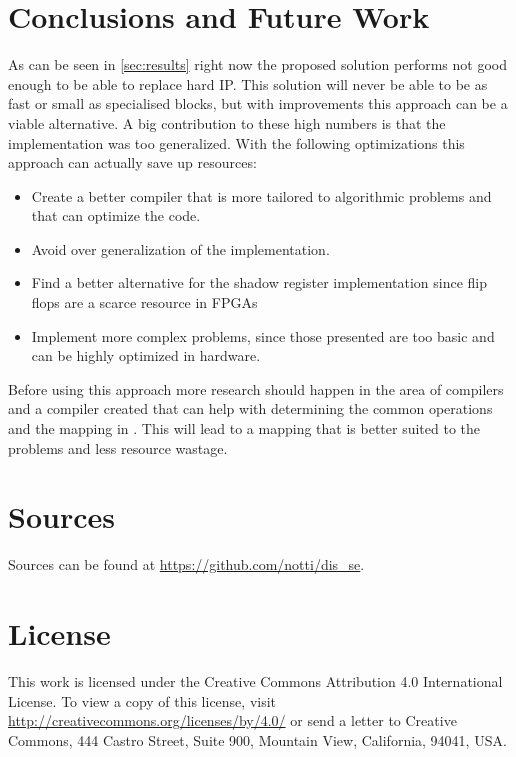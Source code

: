 \documentclass[11pt,twocolumn,technote,a4paper]{IEEEtran}
\begin{document}
\section{Conclusions and Future Work}
As can be seen in \cref{sec:results} right now the proposed solution
performs not good enough to be able to replace hard IP. This solution
will never be able to be as fast or small as specialised blocks, but
with improvements this approach can be a viable alternative. A big contribution
to these high numbers is that the implementation was too generalized. With
the following optimizations this approach can actually save up resources:
\begin{itemize}
    \item Create a better compiler that is more tailored to algorithmic
        problems and that can optimize the code.
    \item Avoid over generalization of the implementation.
    \item Find a better alternative for the shadow register implementation
        since flip flops are a scarce resource in FPGAs
    \item Implement more complex problems, since those presented are too basic
        and can be highly optimized in hardware.
\end{itemize}
Before using this approach more research should happen in the area of compilers
and a compiler created that can help with determining the common operations
and the mapping in . This will lead to a mapping that is
better suited to the problems and less resource wastage.


\begingroup
\raggedright
\sloppy

\endgroup

\section*{Sources}
Sources can be found at \url{https://github.com/notti/dis_se}.
\section*{License}

This work is licensed under the Creative Commons Attribution 4.0 International
License. To view a copy of this license, visit
\url{http://creativecommons.org/licenses/by/4.0/} or send a letter to Creative
Commons, 444 Castro Street, Suite 900, Mountain View, California, 94041, USA.
\end{document}
